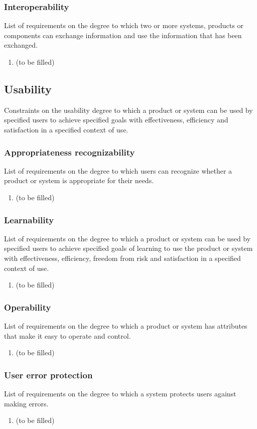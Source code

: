 \subsubsection{Interoperability}
List of requirements on the degree to which two or more systems, products or  components can exchange information and use the information that has been exchanged.
\begin{enumerate}
\item (to be filled)
\end{enumerate}


\subsection{Usability}
Constraints on the usability
degree to which a product or system can be used by specified users to achieve specified goals with effectiveness, efficiency and satisfaction in a specified context of use.
\subsubsection{Appropriateness recognizability}
List of requirements on the degree to which users can recognize whether a product or system is appropriate for their needs.
\begin{enumerate}
\item (to be filled)
\end{enumerate}
\subsubsection{Learnability}
List of requirements on the degree to which a product or system can be used by specified users to achieve specified goals of learning to use the product or system with effectiveness, efficiency, freedom from risk and satisfaction in a specified context of use.
\begin{enumerate}
\item (to be filled)
\end{enumerate}
\subsubsection{Operability}
List of requirements on the degree to which a product or system has attributes that make it easy to operate and control.
\begin{enumerate}
\item (to be filled)
\end{enumerate}
\subsubsection{User error protection}
List of requirements on the degree to which a system protects users against making errors.
\begin{enumerate}
\item (to be filled)
\end{enumerate}
